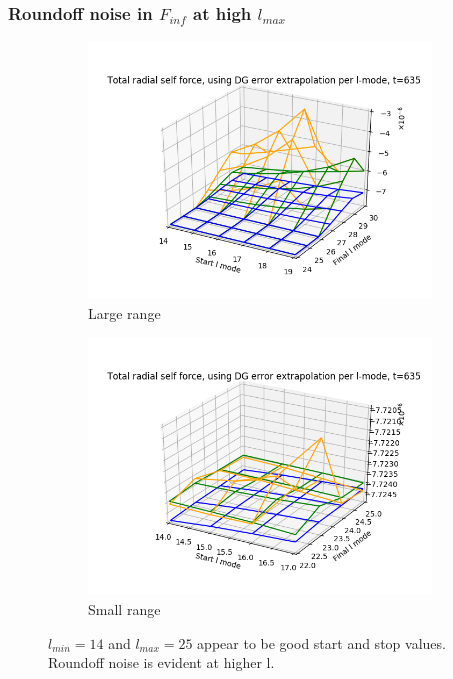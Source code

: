 \documentclass{beamer}
\begin{document}
\begin{frame}
  \frametitle{Roundoff noise in $F_{inf}$ at high $l_{max}$}
  \begin{figure}
    \centering
    \begin{subfigure}{.45\textwidth}
      \centering
      \includegraphics[width=\textwidth]{bestfinflminlmax234terms635fullrange_perihelion}
      \caption{Large range}
    \end{subfigure}
    \begin{subfigure}{.45\textwidth}
      \centering
      \includegraphics[width=\textwidth]{bestfinflminlmax234termst635smallrange_perihelion}
      \caption{Small range}
    \end{subfigure}
  \caption{$l_{min}=14$ and $l_{max}=25$ appear to be good start and stop values. Roundoff noise is evident at higher l.}
  \end{figure}
\end{frame}
\end{document}
